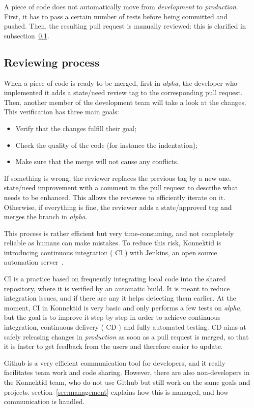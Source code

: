 A piece of code does not automatically move from \textit{development} to \textit{production}. First, it has to pass a certain number of tests before being committed and pushed. Then, the resulting pull request is manually reviewed: this is clarified in {\sc subsection}~\ref{ssec:reviewing}.

\subsection{Reviewing process}
\label{ssec:reviewing}

When a piece of code is ready to be merged, first in \textit{alpha}, the developer who implemented it adds a \guillemotleft{} state/need review \guillemotright{} tag to the corresponding pull request. Then, another member of the development team will take a look at the changes. This verification has three main goals:

\begin{itemize}[noitemsep]
	\item Verify that the changes fulfill their goal;
 	\item Check the quality of the code (for instance the indentation);
	\item Make sure that the merge will not cause any conflicts.
\end{itemize}

If something is wrong, the reviewer replaces the previous tag by a new one, \guillemotleft{} state/need improvement \guillemotright{} with a comment in the pull request to describe what needs to be enhanced. This allows the reviewee to efficiently iterate on it. Otherwise, if everything is fine, the reviewer adds a \guillemotleft{} state/approved \guillemotright{} tag and merges the branch in \textit{alpha}.

This process is rather efficient but very time-consuming, and not completely reliable as humans can make mistakes. To reduce this risk, Konnektid is introducing continuous integration (\guillemotleft{} CI \guillemotright{}) with Jenkins, an open source automation server~\cite{jenkins}. 

CI is a practice based on frequently integrating local code into the shared repository, where it is verified by an automatic build. It is meant to reduce integration issues, and if there are any it helps detecting them earlier. At the moment, CI in Konnektid is very basic and only performs a few tests on \textit{alpha}, but the goal is to improve it step by step in order to achieve continuous integration, continuous delivery (\guillemotleft{} CD \guillemotright{}) and fully automated testing. CD aims at safely releasing changes in \textit{production} as soon as a pull request is merged, so that it is faster to get feedback from the users and therefore easier to update.

Github is a very efficient communication tool for developers, and it really facilitates team work and code sharing. However, there are also non-developers in the Konnektid team, who do not use Github but still work on the same goals and projects. {\sc section}~\ref{sec:management} explains how this is managed, and how communication is handled.